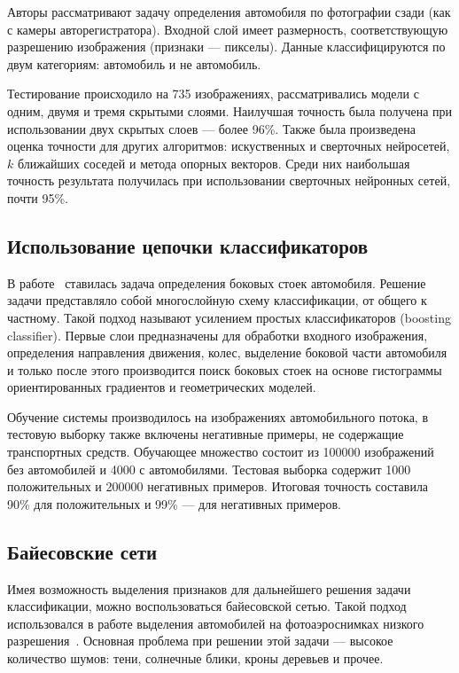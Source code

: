 \documentclass[a4paper,14pt]{extarticle} %
\begin{document}
Авторы рассматривают задачу определения автомобиля по фотографии сзади (как с камеры авторегистратора). Входной слой имеет размерность, соответствующую разрешению изображения (признаки --- пикселы). Данные классифицируются по двум категориям: автомобиль и не автомобиль.

Тестирование происходило на 735 изображениях, рассматривались модели с одним, двумя и тремя скрытыми слоями. Наилучшая точность была получена при использовании двух скрытых слоев --- более 96\%. Также была произведена оценка точности для других алгоритмов: искуственных и сверточных нейросетей, $k$ ближайших соседей и метода опорных векторов. Среди них наибольшая точность результата получилась при использовании сверточных нейронных сетей, почти 95\%.

\subsection{Использование цепочки классификаторов}
\hspace{\parindent} В работе~\cite{brehar2010pillars} ставилась задача определения боковых стоек автомобиля. Решение задачи представляло собой многослойную схему классификации, от общего к частному. Такой подход называют усилением простых классификаторов (boosting classifier). Первые слои предназначены для обработки входного изображения, определения направления движения, колес, выделение боковой части автомобиля и только после этого производится поиск боковых стоек на основе гистограммы ориентированных градиентов и геометрических моделей.

Обучение системы производилось на изображениях автомобильного потока, в тестовую выборку также включены негативные примеры, не содержащие транспортных средств. Обучающее множество состоит из 100000 изображений без автомобилей и 4000 с автомобилями. Тестовая выборка содержит 1000 положительных и 200000 негативных примеров. Итоговая точность составила 90\% для положительных и 99\% --- для негативных примеров.

\subsection{Байесовские сети} 
\hspace{\parindent} Имея возможность выделения признаков для дальнейшего решения задачи классификации, можно воспользоваться байесовской сетью. Такой подход использовался в работе выделения автомобилей на фотоаэроснимках низкого разрешения~\cite{zhao2003car}. Основная проблема при решении этой задачи --- высокое количество шумов: тени, солнечные блики, кроны деревьев и прочее.
\end{document}
